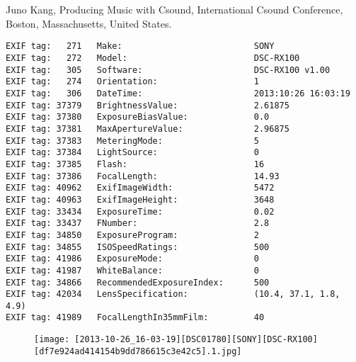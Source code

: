 \section{\protect{}}
\noindent Juno Kang, Producing Music with Csound, International Csound Conference, Boston, Massachusetts, United States.
\noindent
\begin{lstlisting}
EXIF tag:   271   Make:                          SONY
EXIF tag:   272   Model:                         DSC-RX100
EXIF tag:   305   Software:                      DSC-RX100 v1.00
EXIF tag:   274   Orientation:                   1
EXIF tag:   306   DateTime:                      2013:10:26 16:03:19
EXIF tag: 37379   BrightnessValue:               2.61875
EXIF tag: 37380   ExposureBiasValue:             0.0
EXIF tag: 37381   MaxApertureValue:              2.96875
EXIF tag: 37383   MeteringMode:                  5
EXIF tag: 37384   LightSource:                   0
EXIF tag: 37385   Flash:                         16
EXIF tag: 37386   FocalLength:                   14.93
EXIF tag: 40962   ExifImageWidth:                5472
EXIF tag: 40963   ExifImageHeight:               3648
EXIF tag: 33434   ExposureTime:                  0.02
EXIF tag: 33437   FNumber:                       2.8
EXIF tag: 34850   ExposureProgram:               2
EXIF tag: 34855   ISOSpeedRatings:               500
EXIF tag: 41986   ExposureMode:                  0
EXIF tag: 41987   WhiteBalance:                  0
EXIF tag: 34866   RecommendedExposureIndex:      500
EXIF tag: 42034   LensSpecification:             (10.4, 37.1, 1.8, 4.9)
EXIF tag: 41989   FocalLengthIn35mmFilm:         40

\end{lstlisting}
\clearpage
\begin{figure}
\raggedleft
\texttt{[image: [2013-10-26\_16-03-19][DSC01780][SONY][DSC-RX100][df7e924ad414154b9dd786615c3e42c5].1.jpg]}
\end{figure}


\clearpage
